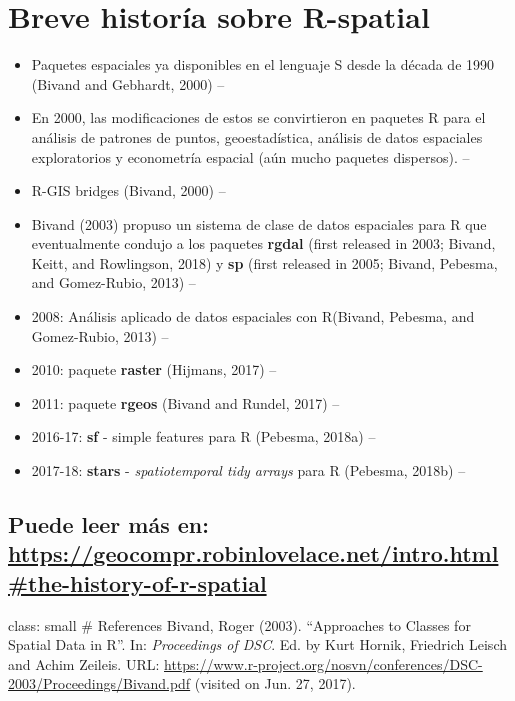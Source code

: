 \documentclass[]{article}
\begin{document}
\section{Breve historía sobre
R-spatial}\label{breve-historia-sobre-r-spatial}

\begin{itemize}
\item
  Paquetes espaciales ya disponibles en el lenguaje S desde la década de
  1990 (Bivand and Gebhardt, 2000) --
\item
  En 2000, las modificaciones de estos se convirtieron en paquetes R
  para el análisis de patrones de puntos, geoestadística, análisis de
  datos espaciales exploratorios y econometría espacial (aún mucho
  paquetes dispersos). --
\item
  R-GIS bridges (Bivand, 2000) --
\item
  Bivand (2003) propuso un sistema de clase de datos espaciales para R
  que eventualmente condujo a los paquetes \textbf{rgdal} (first
  released in 2003; Bivand, Keitt, and Rowlingson, 2018) y \textbf{sp}
  (first released in 2005; Bivand, Pebesma, and Gomez-Rubio, 2013) --
\item
  2008: Análisis aplicado de datos espaciales con R(Bivand, Pebesma, and
  Gomez-Rubio, 2013) --
\item
  2010: paquete \textbf{raster} (Hijmans, 2017) --
\item
  2011: paquete \textbf{rgeos} (Bivand and Rundel, 2017) --
\item
  2016-17: \textbf{sf} - simple features para R (Pebesma, 2018a) --
\item
  2017-18: \textbf{stars} - \emph{spatiotemporal tidy arrays} para R
  (Pebesma, 2018b) -- 
\end{itemize}

\subsection{\texorpdfstring{Puede leer más en:
\url{https://geocompr.robinlovelace.net/intro.html\#the-history-of-r-spatial}}{Puede leer más en: https://geocompr.robinlovelace.net/intro.html\#the-history-of-r-spatial}}\label{puede-leer-mas-en-httpsgeocompr.robinlovelace.netintro.htmlthe-history-of-r-spatial}

class: small \# References Bivand, Roger (2003). ``Approaches to Classes
for Spatial Data in R''. In: \emph{Proceedings of DSC}. Ed. by Kurt
Hornik, Friedrich Leisch and Achim Zeileis. URL:
\url{https://www.r-project.org/nosvn/conferences/DSC-2003/Proceedings/Bivand.pdf}
(visited on Jun. 27, 2017).
\end{document}
